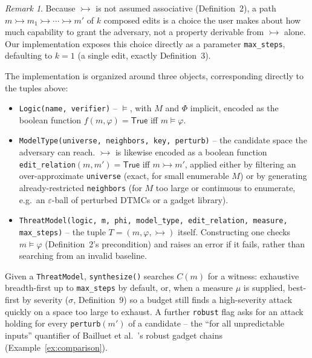 \documentclass[11pt]{amsart}
\theoremstyle{definition}
\theoremstyle{remark}
\newtheorem*{remark}{Remark}
\newcommand{\adv}{\rightarrowtail}   %
\begin{document}
\begin{remark}
Because $\adv$ is not assumed associative (Definition~2), a path $m \adv m_1 \adv \cdots \adv m'$ of
$k$ composed edits is a choice the user makes about how much capability to grant the adversary, not
a property derivable from $\adv$ alone. Our implementation exposes this choice directly as a
parameter \texttt{max\_steps}, defaulting to $k = 1$ (a single edit, exactly Definition~3).
\end{remark}

The implementation is organized around three objects, corresponding directly to the tuples above:

\begin{itemize}
  \item \texttt{Logic(name, verifier)} -- $\models$, with $M$ and $\Phi$ implicit, encoded as the
  boolean function $f(m, \varphi) = \mathsf{True}$ iff $m \models \varphi$.
  \item \texttt{ModelType(universe, neighbors, key, perturb)} -- the candidate space the adversary
  can reach. $\adv$ is likewise encoded as a boolean function
  \texttt{edit\_relation}$(m, m') = \mathsf{True}$ iff $m \adv m'$, applied either by filtering an
  over-approximate \texttt{universe} (exact, for small enumerable $M$) or by generating
  already-restricted \texttt{neighbors} (for $M$ too large or continuous to enumerate, e.g.\ an
  $\varepsilon$-ball of perturbed DTMCs or a gadget library).
  \item \texttt{ThreatModel(logic, m, phi, model\_type, edit\_relation, measure, max\_steps)} -- the
  tuple $T = (m, \varphi, \adv)$ itself. Constructing one checks $m \models \varphi$ (Definition~2's
  precondition) and raises an error if it fails, rather than searching from an invalid baseline.
\end{itemize}

Given a \texttt{ThreatModel}, \texttt{synthesize()} searches $C(m)$ for a witness: exhaustive
breadth-first up to \texttt{max\_steps} by default, or, when a measure $\mu$ is supplied, best-first
by severity ($\sigma$, Definition~9) so a budget still finds a high-severity attack quickly on a
space too large to exhaust. A further \texttt{robust} flag asks for an attack holding for every
\texttt{perturb}$(m')$ of a candidate -- the ``for all unpredictable inputs'' quantifier of Bailluet
et al.\ \cite{bailluet}'s robust gadget chains (Example~\ref{ex:comparison}).
\end{document}
